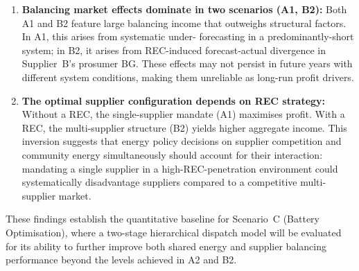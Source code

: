 \begin{enumerate}
    \item \textbf{Balancing market effects dominate in two scenarios (A1,
          B2):}  Both A1 and B2 feature large balancing income that outweighs
          structural factors.  In A1, this arises from systematic under-
          forecasting in a predominantly-short system; in B2, it arises from
          REC-induced forecast-actual divergence in Supplier~B's prosumer BG.
          These effects may not persist in future years with different system
          conditions, making them unreliable as long-run profit drivers.

    \item \textbf{The optimal supplier configuration depends on REC strategy:}
          Without a REC, the single-supplier mandate (A1) maximises profit.  With
          a REC, the multi-supplier structure (B2) yields higher aggregate income.
          This inversion suggests that energy policy decisions on supplier
          competition and community energy simultaneously should account for their
          interaction: mandating a single supplier in a high-REC-penetration
          environment could systematically disadvantage suppliers compared to a
          competitive multi-supplier market.
\end{enumerate}

These findings establish the quantitative baseline for Scenario~C
(Battery Optimisation), where a two-stage hierarchical dispatch model will
be evaluated for its ability to further improve both shared energy and supplier
balancing performance beyond the levels achieved in A2 and B2.
